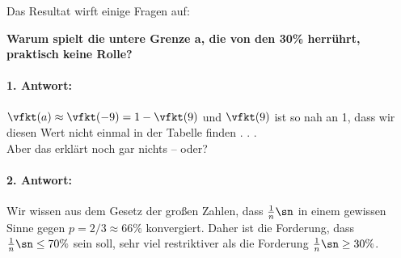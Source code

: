 Das Resultat wirft einige Fragen auf:
\begin{fr}
    \textbf{Warum spielt die untere Grenze a, die von den 30\% herrührt, praktisch keine
    Rolle?} 

    \paragraph{1. Antwort:} $\vfkt (a) \approx \vfkt(-9) = 1 - \vfkt(9)$ und $\vfkt(9)$ ist so nah an 1, dass wir diesen
    Wert nicht einmal in der Tabelle finden .
    .
    . \\
    Aber das erklärt noch gar nichts – oder?

    \paragraph{2. Antwort:} Wir wissen aus dem Gesetz der großen Zahlen, dass $\frac{1}{n} \sn$ in einem
    gewissen Sinne gegen $p = 2/3 \approx 66\%$ konvergiert.
    Daher ist die Forderung,
    dass $\frac{1}{n} \sn \leq 70\%$ sein soll, sehr viel restriktiver als die Forderung $\frac{1}{n} \sn \geq 30\%$.
\end{fr}


